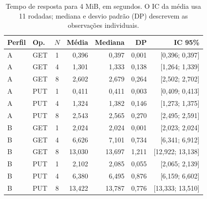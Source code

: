\begin{table}[htbp]
	\centering
	\caption{Tempo de resposta para 4 MiB, em segundos. O IC da média usa 11 rodadas; mediana e
		desvio padrão (DP) descrevem as observações individuais.}
	\label{tab:tempos}
	\begin{tabular}{llcrrrr}
		\toprule
		Perfil & Op. & $N$ & Média & Mediana & DP & IC 95\% \\
		\midrule
		A & GET & 1 & 0,396 & 0,397 & 0,001 & [0,396; 0,397] \\
		A & GET & 4 & 1,301 & 1,333 & 0,138 & [1,264; 1,339] \\
		A & GET & 8 & 2,602 & 2,679 & 0,264 & [2,502; 2,702] \\
		A & PUT & 1 & 0,411 & 0,411 & 0,003 & [0,409; 0,413] \\
		A & PUT & 4 & 1,324 & 1,382 & 0,146 & [1,273; 1,375] \\
		A & PUT & 8 & 2,543 & 2,565 & 0,270 & [2,495; 2,591] \\
		B & GET & 1 & 2,024 & 2,024 & 0,001 & [2,023; 2,024] \\
		B & GET & 4 & 6,626 & 7,101 & 0,734 & [6,341; 6,912] \\
		B & GET & 8 & 13,030 & 13,697 & 1,211 & [12,922; 13,138] \\
		B & PUT & 1 & 2,102 & 2,085 & 0,055 & [2,065; 2,139] \\
		B & PUT & 4 & 6,380 & 6,495 & 0,876 & [6,159; 6,602] \\
		B & PUT & 8 & 13,422 & 13,787 & 0,776 & [13,333; 13,510] \\
		\bottomrule
	\end{tabular}
\end{table}

